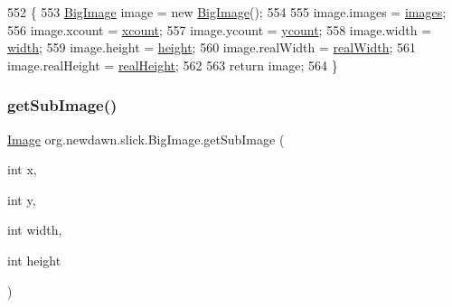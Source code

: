 \begin{DoxyCode}
552                                                       \{
553         \mbox{\hyperlink{classorg_1_1newdawn_1_1slick_1_1_big_image_a729b8a17ca390d0ad9fa715269b17009}{BigImage}} image = \textcolor{keyword}{new} \mbox{\hyperlink{classorg_1_1newdawn_1_1slick_1_1_big_image_a729b8a17ca390d0ad9fa715269b17009}{BigImage}}();
554         
555         image.images = \mbox{\hyperlink{classorg_1_1newdawn_1_1slick_1_1_big_image_a297fc524b2aef82e75e23a59c6f4102f}{images}};
556         image.xcount = \mbox{\hyperlink{classorg_1_1newdawn_1_1slick_1_1_big_image_ae42c6b98e3a7924bf005b1b356cca4c2}{xcount}};
557         image.ycount = \mbox{\hyperlink{classorg_1_1newdawn_1_1slick_1_1_big_image_a699c6b87723d356a7062f79c35c6be5a}{ycount}};
558         image.width = \mbox{\hyperlink{classorg_1_1newdawn_1_1slick_1_1_image_a7d02c85e21b388428cfe5cc5c82714a1}{width}};
559         image.height = \mbox{\hyperlink{classorg_1_1newdawn_1_1slick_1_1_image_a54397a37823bc59ddc79ec70dc5cf226}{height}};
560         image.realWidth = \mbox{\hyperlink{classorg_1_1newdawn_1_1slick_1_1_big_image_af37ee66244f573122b1b87b4f03e2ac0}{realWidth}};
561         image.realHeight = \mbox{\hyperlink{classorg_1_1newdawn_1_1slick_1_1_big_image_a4a9f1e4248d72ff16ea9e0abe7902685}{realHeight}};
562         
563         \textcolor{keywordflow}{return} image;
564     \}
\end{DoxyCode}
\mbox{\label{classorg_1_1newdawn_1_1slick_1_1_big_image_a9384aa6b99cc0b45947a5b66bf2ab19c}} 
\subsubsection{\texorpdfstring{get\+Sub\+Image()}{getSubImage()}\hspace{0.1cm}{\footnotesize\ttfamily [1/2]}}
{\footnotesize\ttfamily \mbox{\hyperlink{classorg_1_1newdawn_1_1slick_1_1_image}{Image}} org.\+newdawn.\+slick.\+Big\+Image.\+get\+Sub\+Image (\begin{DoxyParamCaption}\item[{int}]{x,  }\item[{int}]{y,  }\item[{int}]{width,  }\item[{int}]{height }\end{DoxyParamCaption})\hspace{0.3cm}{\ttfamily [inline]}}

